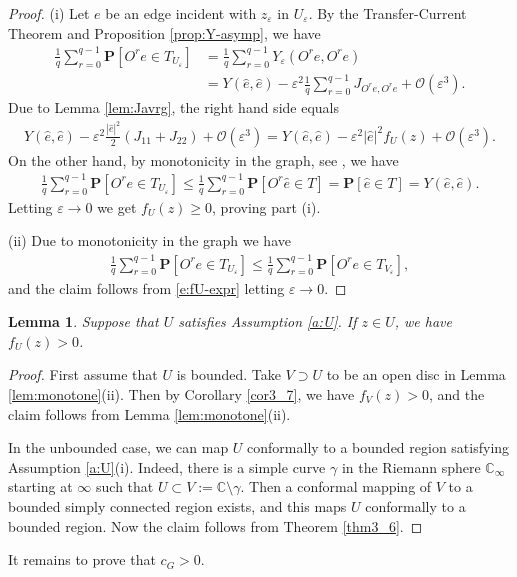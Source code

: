 \documentclass[11pt]{article}
\newtheorem{lemma}[theorem]{Lemma}
\theoremstyle{remark}
\def\eps{\varepsilon}
\newcommand{\eqnspl}[2]{\begin{equation}\begin{split}\label{#1}%
   #2\end{split}\end{equation}}
\newcommand{\eqnsplst}[1]{\begin{equation*}\begin{split}%
   #1\end{split}\end{equation*}}
\begin{document}
\begin{proof}
(i) Let $e$ be an edge incident with $z_\eps$ in $U_\eps$. By the Transfer-Current Theorem and 
Proposition \ref{prop:Y-asymp}, we have
\eqnsplst{
 \frac{1}{q} \sum_{r=0}^{q-1} \mathbf{P} [O^r e \in T_{U_\eps}]
 &= \frac{1}{q} \sum_{r=0}^{q-1} Y_\eps(O^r e, O^r e) \\
 &= Y(\hat{e}, \hat{e}) - \eps^2 \frac{1}{q} \sum_{r=0}^{q-1} J_{O^r e, O^r e} + \mathcal{O}(\eps^3). }
Due to Lemma \ref{lem:Javrg}, the right hand side equals
\eqnspl{e:fU-expr}{
 Y(\hat{e}, \hat{e}) - \eps^2 \frac{|\hat{e}|^2}{2} (J_{11} + J_{22}) + \mathcal{O}(\eps^3)
 = Y(\hat{e}, \hat{e}) - \eps^2 |\hat{e}|^2 f_U(z) + \mathcal{O}(\eps^3). }
On the other hand, by monotonicity in the graph, see \cite[Exercise 10.8]{LyonsTrees}, we have
\eqnsplst{
 \frac{1}{q} \sum_{r=0}^{q-1} \mathbf{P} [O^r e \in T_{U_\eps}]
 \le \frac{1}{q} \sum_{r=0}^{q-1} \mathbf{P} [O^r \hat{e} \in T]
 = \mathbf{P} [\hat{e} \in T]
 = Y(\hat{e}, \hat{e}). }
Letting $\eps \to 0$ we get $f_U(z) \ge 0$, proving part (i).

(ii) Due to monotonicity in the graph we have
\eqnsplst{
 \frac{1}{q} \sum_{r=0}^{q-1} \mathbf{P} [O^r e \in T_{U_\eps}]
 \le \frac{1}{q} \sum_{r=0}^{q-1} \mathbf{P} [O^r e \in T_{V_\eps}], }
and the claim follows from \ref{e:fU-expr} letting $\eps \to 0$.
\end{proof}

\begin{lemma}
\label{lem:fU>0}
Suppose that $U$ satisfies Assumption \ref{a:U}. If $z \in U$, we have $f_U(z) > 0$.
\end{lemma}

\begin{proof}
First assume that $U$ is bounded.
Take $V \supset U$ to be an open disc in Lemma \ref{lem:monotone}(ii). Then by Corollary \ref{cor3_7}, 
we have $f_V(z) > 0$, and the claim follows from Lemma \ref{lem:monotone}(ii).

In the unbounded case, we can map $U$ conformally to a bounded region satisfying Assumption
\ref{a:U}(i). Indeed, there is a simple curve $\gamma$ in the Riemann sphere $\mathbb{C}_\infty$
starting at $\infty$ such that $U \subset V := \mathbb{C} \setminus \gamma$. Then a conformal
mapping of $V$ to a bounded simply connected region exists, and this maps $U$ conformally 
to a bounded region. Now the claim follows from Theorem \ref{thm3_6}.
\end{proof}

It remains to prove that $c_G > 0$.
\end{document}
